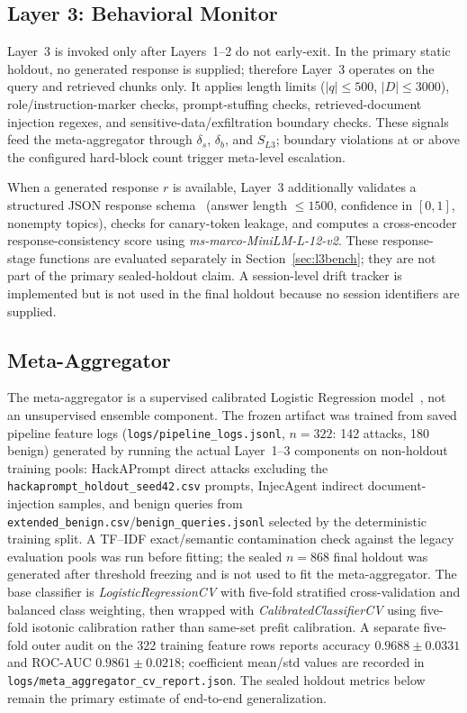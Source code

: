 ﻿\documentclass[conference]{IEEEtran}
\begin{document}
\subsection{Layer 3: Behavioral Monitor}
\label{sec:l3}

Layer~3 is invoked only after Layers~1--2 do not early-exit. In the primary
static holdout, no generated response is supplied; therefore Layer~3 operates
on the query and retrieved chunks only. It applies length limits
($|q|\leq500$, $|D|\leq3000$), role/instruction-marker checks, prompt-stuffing
checks, retrieved-document injection regexes, and sensitive-data/exfiltration
boundary checks. These signals feed the meta-aggregator through $\delta_s$,
$\delta_b$, and $S_{L3}$; boundary violations at or above the configured
hard-block count trigger meta-level escalation.

When a generated response $r$ is available, Layer~3 additionally validates a
structured JSON response schema~\cite{pydantic2024} (answer length
$\leq1500$, confidence in $[0,1]$, nonempty topics), checks for canary-token
leakage, and computes a cross-encoder response-consistency score using
\textit{ms-marco-MiniLM-L-12-v2}. These response-stage functions are evaluated
separately in Section~\ref{sec:l3bench}; they are not part of the primary
sealed-holdout claim. A session-level drift tracker is implemented but is not
used in the final holdout because no session identifiers are supplied.

\subsection{Meta-Aggregator}

The meta-aggregator is a supervised calibrated Logistic Regression
model~\cite{pedregosa2011}, not an unsupervised ensemble component.
The frozen artifact was trained from saved pipeline feature logs
(\texttt{logs/pipeline\_logs.jsonl}, $n=322$: 142 attacks, 180 benign)
generated by running the actual Layer~1--3 components on non-holdout
training pools: HackAPrompt direct attacks excluding the
\texttt{hackaprompt\_holdout\_seed42.csv} prompts, InjecAgent indirect
document-injection samples, and benign queries from
\texttt{extended\_benign.csv}/\texttt{benign\_queries.jsonl} selected by the
deterministic training split. A TF--IDF exact/semantic contamination check
against the legacy evaluation pools was run before fitting; the sealed
$n=868$ final holdout was generated after threshold freezing and is not used
to fit the meta-aggregator. The base classifier is \textit{LogisticRegressionCV}
with five-fold stratified cross-validation and balanced class weighting, then
wrapped with \textit{CalibratedClassifierCV} using five-fold isotonic
calibration rather than same-set prefit calibration. A separate five-fold
outer audit on the 322 training feature rows reports accuracy
$0.9688 \pm 0.0331$ and ROC-AUC $0.9861 \pm 0.0218$; coefficient
mean/std values are recorded in
\texttt{logs/meta\_aggregator\_cv\_report.json}. The sealed holdout metrics
below remain the primary estimate of end-to-end generalization.
\end{document}
